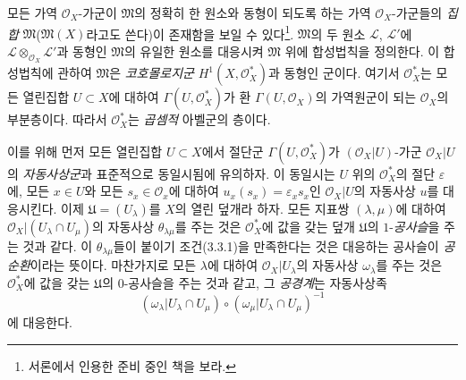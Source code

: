 \begin{env}[5.4.7]
\label{0.5.4.7-ko}
모든 가역 $\mathcal O_X$-가군이 $\mathfrak M$의 정확히 한 원소와
동형이 되도록 하는 가역 $\mathcal O_X$-가군들의 \emph{집합}
$\mathfrak M$($\mathfrak M(X)$라고도 쓴다)이 존재함을 보일 수
있다\footnote{서론에서 인용한 준비 중인 책을 보라.}. $\mathfrak M$의
두 원소 $\mathcal L$, $\mathcal L'$에
$\mathcal L\otimes_{\mathcal O_X}\mathcal L'$과 동형인
$\mathfrak M$의 유일한 원소를 대응시켜 $\mathfrak M$ 위에 합성법칙을
정의한다. 이 합성법칙에 관하여 $\mathfrak M$은 \emph{코호몰로지군}
$H^1(X,\mathcal O_X^*)$과 동형인 군이다. 여기서 $\mathcal O_X^*$는
모든 열린집합 $U\subset X$에 대하여
$\Gamma(U,\mathcal O_X^*)$가 환 $\Gamma(U,\mathcal O_X)$의 가역원군이
되는 $\mathcal O_X$의 부분층이다. 따라서 $\mathcal O_X^*$는
\emph{곱셈적} 아벨군의 층이다.

이를 위해 먼저 모든 열린집합 $U\subset X$에서 절단군
$\Gamma(U,\mathcal O_X^*)$가 $(\mathcal O_X|U)$-가군
$\mathcal O_X|U$의 \emph{자동사상군}과 표준적으로 동일시됨에
유의하자. 이 동일시는 $U$ 위의 $\mathcal O_X^*$의 절단
$\varepsilon$에, 모든 $x\in U$와 모든 $s_x\in\mathcal O_x$에 대하여
$u_x(s_x)=\varepsilon_xs_x$인 $\mathcal O_X|U$의 자동사상 $u$를
대응시킨다. 이제 $\mathfrak U=(U_\lambda)$를 $X$의 열린 덮개라 하자.
모든 지표쌍 $(\lambda,\mu)$에 대하여
$\mathcal O_X|(U_\lambda\cap U_\mu)$의 자동사상
$\theta_{\lambda\mu}$를 주는 것은 $\mathcal O_X^*$에 값을 갖는 덮개
$\mathfrak U$의 $1$-\emph{공사슬}을 주는 것과 같다. 이
$\theta_{\lambda\mu}$들이 붙이기 조건(3.3.1)을 만족한다는 것은
대응하는 공사슬이 \emph{공순환}이라는 뜻이다. 마찬가지로 모든
$\lambda$에 대하여 $\mathcal O_X|U_\lambda$의 자동사상
$\omega_\lambda$를 주는 것은 $\mathcal O_X^*$에 값을 갖는
$\mathfrak U$의 $0$-공사슬을 주는 것과 같고, 그 \emph{공경계}는
자동사상족
\[
  (\omega_\lambda|U_\lambda\cap U_\mu)\circ
  (\omega_\mu|U_\lambda\cap U_\mu)^{-1}
\]
에 대응한다.


\end{env}

